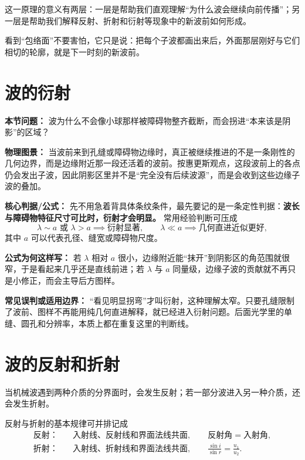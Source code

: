 \documentclass[lang=cn,11pt]{elegantbook}
\begin{document}
这一原理的意义有两层：一层是帮助我们直观理解“为什么波会继续向前传播”；另一层是帮助我们解释反射、折射和衍射等现象中的新波前如何形成。

\begin{note}
看到“包络面”不要害怕，它只是说：把每个子波都画出来后，外面那层刚好与它们相切的轮廓，就是下一时刻的新波前。
\end{note}

\section{波的衍射}

\textbf{本节问题：} 波为什么不会像小球那样被障碍物整齐截断，而会拐进“本来该是阴影”的区域？

\textbf{物理图景：} 当波前来到孔缝或障碍物边缘时，真正被继续推进的不是一条刚性的几何边界，而是边缘附近那一段还活着的波前。按惠更斯观点，这段波前上的各点仍会发出子波，因此阴影区里并不是“完全没有后续波源”，而是会收到这些边缘子波的叠加。

\textbf{核心判据/公式：} 先不用急着背具体条纹条件，最先要记的是一条定性判据：\textbf{波长与障碍物特征尺寸可比时，衍射才会明显。} 常用经验判断可压成
\[
\lambda\sim a \text{ 或 } \lambda>a \implies \text{衍射显著},\qquad
\lambda\ll a \implies \text{几何直进近似更好},
\]
其中 \(a\) 可以代表孔径、缝宽或障碍物尺度。

\textbf{公式为何这样写：} 若 \(\lambda\) 相对 \(a\) 很小，边缘附近能“抹开”到阴影区的角范围就很窄，于是看起来几乎还是直线前进；若 \(\lambda\) 与 \(a\) 同量级，边缘子波的贡献就不再只是小修正，而会主导后方图样。

\textbf{常见误判或适用边界：} “看见明显拐弯”才叫衍射，这种理解太窄。只要孔缝限制了波前、图样不再能用纯几何直进解释，就已经进入衍射问题。后面光学里的单缝、圆孔和分辨率，本质上都在重复这里的判断线。

\section{波的反射和折射}

当机械波遇到两种介质的分界面时，会发生反射；若一部分波进入另一种介质，还会发生折射。

反射与折射的基本规律可并排记成
\[
\begin{aligned}
\text{反射：}\quad &\text{入射线、反射线和界面法线共面},\qquad \text{反射角}=\text{入射角},\\
\text{折射：}\quad &\text{入射线、折射线和界面法线共面},\qquad \frac{\sin i}{\sin r}=\frac{u_1}{u_2}.
\end{aligned}
\]
\end{document}
